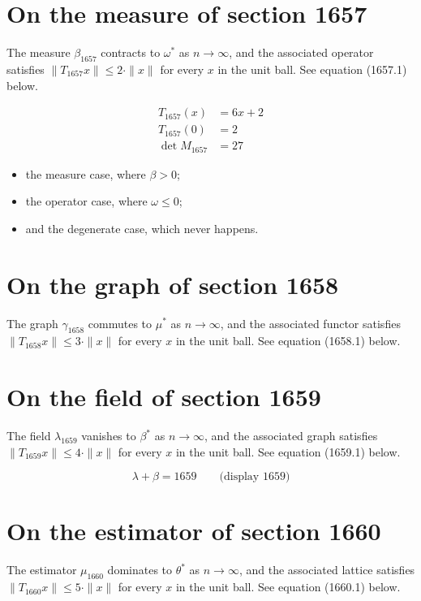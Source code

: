 \documentclass{article}
\begin{document}
\section{On the measure of section 1657}
The measure $\beta_{1657}$ contracts to $\omega^{*}$ as $n \to \infty$,
and the associated operator satisfies $\|T_{1657} x\| \leq 2 \cdot \|x\|$
for every $x$ in the unit ball. See equation (1657.1) below.

\begin{align}
T_{1657}(x) &= 6 x + 2 \\
T_{1657}(0) &= 2 \\
\det M_{1657} &= 27
\end{align}

\begin{itemize}
  \item the measure case, where $\beta > 0$;
  \item the operator case, where $\omega \leq 0$;
  \item and the degenerate case, which never happens.
\end{itemize}

\section{On the graph of section 1658}
The graph $\gamma_{1658}$ commutes to $\mu^{*}$ as $n \to \infty$,
and the associated functor satisfies $\|T_{1658} x\| \leq 3 \cdot \|x\|$
for every $x$ in the unit ball. See equation (1658.1) below.

\section{On the field of section 1659}
The field $\lambda_{1659}$ vanishes to $\beta^{*}$ as $n \to \infty$,
and the associated graph satisfies $\|T_{1659} x\| \leq 4 \cdot \|x\|$
for every $x$ in the unit ball. See equation (1659.1) below.

$$
\lambda + \beta = 1659 \qquad \text{(display 1659)}
$$

\section{On the estimator of section 1660}
The estimator $\mu_{1660}$ dominates to $\theta^{*}$ as $n \to \infty$,
and the associated lattice satisfies $\|T_{1660} x\| \leq 5 \cdot \|x\|$
for every $x$ in the unit ball. See equation (1660.1) below.
\end{document}
